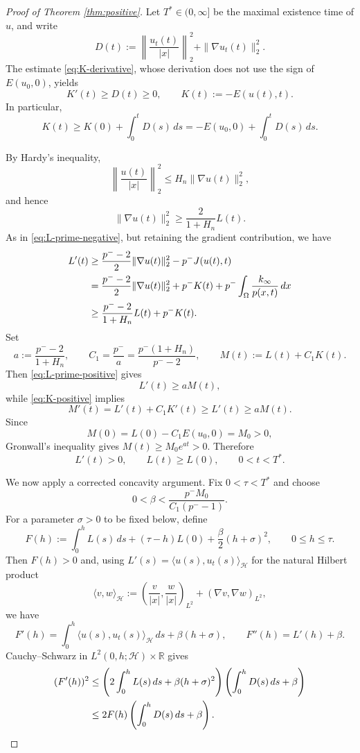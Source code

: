 \documentclass[12pt,reqno]{amsart}
\theoremstyle{definition}
\theoremstyle{remark}
\numberwithin{equation}{section}
\begin{document}
\begin{proof}[Proof of Theorem \ref{thm:positive}]
	Let $T^*\in(0,\infty]$ be the maximal existence time of $u$, and write
	\[
	D(t):=\left\|\frac{u_t(t)}{|x|}\right\|_2^2+\|\nabla u_t(t)\|_2^2.
	\]
	The estimate \eqref{eq:K-derivative}, whose derivation does not use the sign of $E(u_0,0)$, yields
	\begin{equation}\label{eq:K-positive}
	K'(t)\ge D(t)\ge0,
	\qquad K(t):=-E(u(t),t).
	\end{equation}
	In particular,
	\begin{equation}\label{eq:K-integrated}
	K(t)\ge K(0)+\int_0^tD(s)\,ds
	=-E(u_0,0)+\int_0^tD(s)\,ds.
	\end{equation}

	By Hardy's inequality,
	\[
	\left\|\frac{u(t)}{|x|}\right\|_2^2\le H_n\|\nabla u(t)\|_2^2,
	\]
	and hence
	\begin{equation}\label{eq:gradient-controls-L}
	\|\nabla u(t)\|_2^2
	\ge \frac{2}{1+H_n}L(t).
	\end{equation}
	As in \eqref{eq:L-prime-negative}, but retaining the gradient contribution, we have
	\begin{align}
	L'(t)
	&\ge \frac{p^- -2}{2}\|\nabla u(t)\|_2^2-p^-J(u(t),t) \notag\\
	&=\frac{p^- -2}{2}\|\nabla u(t)\|_2^2
	+p^-K(t)+p^-\int_\Omega\frac{k_\infty}{p(x,t)}\,dx \notag\\
	&\ge \frac{p^- -2}{1+H_n}L(t)+p^-K(t). \label{eq:L-prime-positive}
	\end{align}
	Set
	\[
	a:=\frac{p^- -2}{1+H_n},
	\qquad
	C_1=\frac{p^-}{a}=\frac{p^-(1+H_n)}{p^- -2},
	\qquad
	M(t):=L(t)+C_1K(t).
	\]
	Then \eqref{eq:L-prime-positive} gives
	\[
	L'(t)\ge aM(t),
	\]
	while \eqref{eq:K-positive} implies
	\[
	M'(t)=L'(t)+C_1K'(t)\ge L'(t)\ge aM(t).
	\]
	Since
	\[
	M(0)=L(0)-C_1E(u_0,0)=M_0>0,
	\]
	Gronwall's inequality gives $M(t)\ge M_0e^{at}>0$. Therefore
	\begin{equation}\label{eq:L-increasing}
	L'(t)>0,
	\qquad L(t)\ge L(0),
	\qquad 0<t<T^*.
	\end{equation}

	We now apply a corrected concavity argument. Fix $0<\tau<T^*$ and choose
	\begin{equation}\label{eq:beta-choice}
	0<\beta<\frac{p^-M_0}{C_1(p^- -1)}.
	\end{equation}
	For a parameter $\sigma>0$ to be fixed below, define
	\[
	F(h):=\int_0^hL(s)\,ds+(\tau-h)L(0)+\frac{\beta}{2}(h+\sigma)^2,
	\qquad 0\le h\le\tau.
	\]
	Then $F(h)>0$ and, using $L'(s)=\langle u(s),u_t(s)\rangle_{\mathcal H}$ for the natural Hilbert product
	\[
	\langle v,w\rangle_{\mathcal H}
	:=\left(\frac{v}{|x|},\frac{w}{|x|}\right)_{L^2}
	+(\nabla v,\nabla w)_{L^2},
	\]
	we have
	\[
	F'(h)=\int_0^h\langle u(s),u_t(s)\rangle_{\mathcal H}\,ds
	+\beta(h+\sigma),
	\qquad
	F''(h)=L'(h)+\beta.
	\]
	Cauchy--Schwarz in $L^2(0,h;\mathcal H)\times\mathbb R$ gives
	\begin{align}
	(F'(h))^2
	&\le\left(2\int_0^hL(s)\,ds+\beta(h+\sigma)^2\right)
	\left(\int_0^hD(s)\,ds+\beta\right)\notag\\
	&\le 2F(h)\left(\int_0^hD(s)\,ds+\beta\right). \label{eq:F-CS}
	\end{align}


\end{proof}
\end{document}
